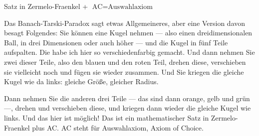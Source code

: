 \begin{math-stroke}
\begin{center}
\end{center}

Satz in Zermelo-Fraenkel + $\text{AC} = \text{Auswahlaxiom}$
\end{math-stroke}

\begin{spoken-clean}[00:02:32 - 00:03:40]
Das Banach-Tarski-Paradox sagt etwas Allgemeineres, aber eine Version davon besagt Folgendes: Sie können eine Kugel nehmen --- also einen dreidimensionalen Ball, in drei Dimensionen oder auch höher --- und die Kugel in fünf Teile aufspalten. Die habe ich hier so verschiedenfarbig gemacht. Und dann nehmen Sie zwei dieser Teile, also den blauen und den roten Teil, drehen diese, verschieben sie vielleicht noch und fügen sie wieder zusammen. Und Sie kriegen die gleiche Kugel wie da links: gleiche Größe, gleicher Radius.

Dann nehmen Sie die anderen drei Teile --- das sind dann orange, gelb und grün ---, drehen und verschieben diese, und kriegen dann wieder die gleiche Kugel wie links. Und das hier ist möglich! Das ist ein mathematischer Satz in Zermelo-Fraenkel plus AC. AC steht für Auswahlaxiom, Axiom of Choice.
\end{spoken-clean}


